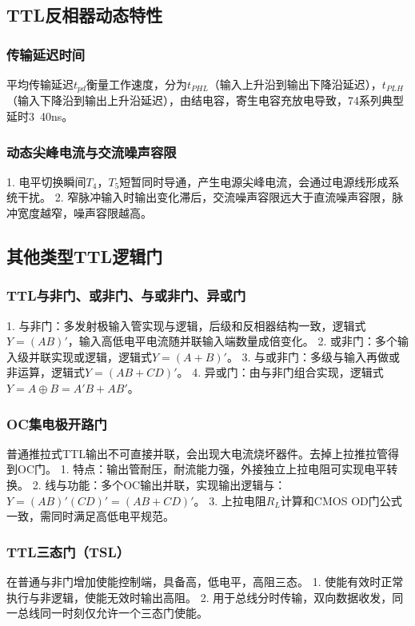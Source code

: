 \subsection{TTL反相器动态特性}
\subsubsection{传输延迟时间}
平均传输延迟\(t_{pd}\)衡量工作速度，分为\(t_{PHL}\)（输入上升沿到输出下降沿延迟），\(t_{PLH}\)（输入下降沿到输出上升沿延迟），由结电容，寄生电容充放电导致，74系列典型延时3~40ns。

\subsubsection{动态尖峰电流与交流噪声容限}
1. 电平切换瞬间\(T_4\)，\(T_5\)短暂同时导通，产生电源尖峰电流，会通过电源线形成系统干扰。
2. 窄脉冲输入时输出变化滞后，交流噪声容限远大于直流噪声容限，脉冲宽度越窄，噪声容限越高。

\subsection{其他类型TTL逻辑门}
\subsubsection{TTL与非门、或非门、与或非门、异或门}
1. 与非门：多发射极输入管实现与逻辑，后级和反相器结构一致，逻辑式\(Y=(AB)'\)，输入高低电平电流随并联输入端数量成倍变化。
2. 或非门：多个输入级并联实现或逻辑，逻辑式\(Y=(A+B)'\)。
3. 与或非门：多级与输入再做或非运算，逻辑式\(Y=(AB+CD)'\)。
4. 异或门：由与非门组合实现，逻辑式\(Y=A\oplus B=A'B+AB'\)。

\subsubsection{OC集电极开路门}
普通推拉式TTL输出不可直接并联，会出现大电流烧坏器件。去掉上拉推拉管得到OC门。
1. 特点：输出管耐压，耐流能力强，外接独立上拉电阻可实现电平转换。
2. 线与功能：多个OC输出并联，实现输出逻辑与：\(Y=(AB)'(CD)'=(AB+CD)'\)。
3. 上拉电阻\(R_L\)计算和CMOS OD门公式一致，需同时满足高低电平规范。

\subsubsection{TTL三态门（TSL）}
在普通与非门增加使能控制端，具备高，低电平，高阻三态。
1. 使能有效时正常执行与非逻辑，使能无效时输出高阻。
2. 用于总线分时传输，双向数据收发，同一总线同一时刻仅允许一个三态门使能。

